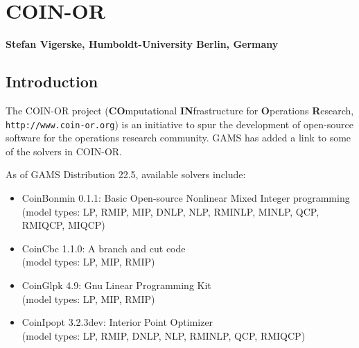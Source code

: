 \renewenvironment{option_tabular}%
{\begin{tabular}{p{.16\textwidth}p{.65\textwidth}p{.11\textwidth}}
\hline
\textbf{Option}      &
\textbf{Description} &
\textbf{Default}     \\
\hline}
{\end{tabular}}

\renewenvironment{tab_list}[1]%
{\begin{list}{}{\vspace*{-1.5ex}\renewcommand{\makelabel}{\desclabel}\parsep-0.15cm\labelwidth#1\leftmargin#1\setlength{\labelsep}{\itemindent}\topsep0cm\parskip0cm\partopsep0cm}}%
{\end{list}}


\chapter{COIN-OR}
\textbf{Stefan Vigerske, Humboldt-University Berlin, Germany}
\vspace{1cm}

\minitoc


\section{Introduction}

The COIN-OR project (\textbf{CO}mputational \textbf{IN}frastructure for \textbf{O}perations \textbf{R}esearch, \texttt{http://www.coin-or.org}) is an initiative to spur the development of open-source software for the operations research community.
GAMS has added a link to some of the solvers in COIN-OR.

As of GAMS Distribution 22.5, available solvers include:

\begin{itemize}
\item CoinBonmin 0.1.1: Basic Open-source Nonlinear Mixed Integer programming\\
(model types: LP, RMIP, MIP, DNLP, NLP, RMINLP, MINLP, QCP, RMIQCP, MIQCP)
\item CoinCbc 1.1.0: A branch and cut code\\
(model types: LP, MIP, RMIP)
\item CoinGlpk 4.9: Gnu Linear Programming Kit\\
(model types: LP, MIP, RMIP)
\item CoinIpopt 3.2.3dev: Interior Point Optimizer\\
(model types: LP, RMIP, DNLP, NLP, RMINLP, QCP, RMIQCP)
\end{itemize}

